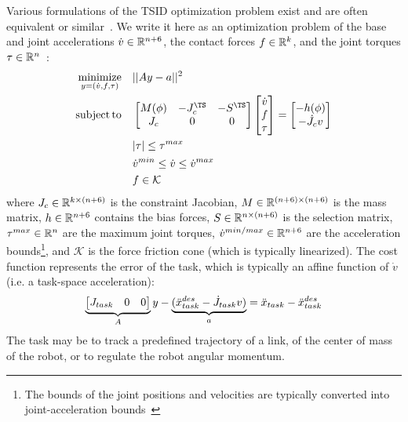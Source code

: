 Various formulations of the TSID optimization problem exist and are often equivalent or similar~\cite{DelPrete2014c}.
We write it here as an optimization problem of the base and joint accelerations $\dot{v} \in \mathbb{R}^{n+6}$, the contact forces \mbox{$f\in \mathbb{R}^{k}$}, and the joint torques $\tau \in \mathbb{R}^{n}$~\cite{Saab2013}:
\begin{subequations} 
\label{eq:TSID}
\begin{align}
\minimize_{y=(\dot{v}, f, \tau)} \quad &|| A y - a||^2 \nonumber\\
\st \quad & \mat{M(\phi) & -J_c^\TS & -S^\TS \\ J_c & 0 & 0} \mat{\dot{v} \\ f \\ \tau} = \mat{- h(\phi) \\ -\dot{J}_c v} \nonumber\\
& | \tau | \le \tau^{max} \label{eq:TSID_torque_lim}\\
& \dot{v}^{min} \le \dot{v} \le \dot{v}^{max} \label{eq:TSID_acc_lim}\\
& f \in \mathcal{K} \label{eq:TSID_force_lim}
\end{align} 
\end{subequations}
where \mbox{$J_c \in \mathbb{R}^{k\times (n+6)}$} is the constraint Jacobian, $M \in \mathbb{R}^{(n+6)\times (n+6)}$ is the mass matrix, $h \in \mathbb{R}^{n+6}$ contains the bias forces, $S\in \mathbb{R}^{n\times (n+6)}$ is the selection matrix, $\tau^{max} \in \mathbb{R}^{n}$ are the maximum joint torques, $\dot{v}^{min/max} \in \mathbb{R}^{n+6}$ are the acceleration bounds\footnote{The bounds of the joint positions and velocities are typically converted into joint-acceleration bounds~\cite{Padois2010}}, and $\mathcal{K}$ is the force friction cone (which is typically linearized).
The cost function represents the error of the task, which is typically an affine function of $\dot{v}$ (i.e. a task-space acceleration):
\begin{equation*} \begin{aligned}
\underbrace{\begin{bmatrix}J_{task} & 0 & 0\end{bmatrix}}_A y - \underbrace{(\ddot{x}_{task}^{des} - \dot{J}_{task} v)}_a = \ddot{x}_{task} - \ddot{x}_{task}^{des}
\end{aligned} \end{equation*}
The task may be to track a predefined trajectory of a link, of the center of mass of the robot, or to regulate the robot angular momentum.

